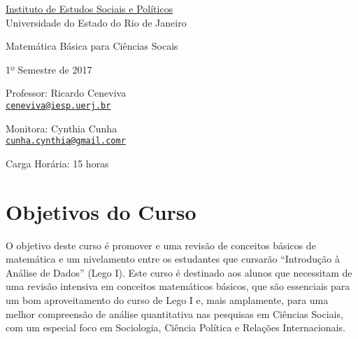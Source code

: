 \documentclass[a4paper, 12pt]{article}
\def\name{Ricardo Ceneviva}
\begin{document}
\pagestyle{plain}



\begin{center}
\begin{bf} 

\href{http://www.iesp.uerj.br/}{Instituto de Estudos Sociais e Políticos} \\

Universidade do Estado do Rio de Janeiro \\


\vspace{0.5cm}

\Large

\Large{Matemática Básica para Ciências Socais}

\vspace{0.5cm}

\normalsize


1º Semestre de 2017 \\
\vspace{0.5cm}


Professor: Ricardo Ceneviva \\
\href{mailto:ceneviva@iesp.uerj.br}{\tt ceneviva@iesp.uerj.br} \\
\vspace{0.25cm}

Monitora: Cynthia Cunha \\
\href{mailto:cunha.cynthia@gmail.com}{\tt cunha.cynthia@gmail.comr} \\
\vspace{0.5cm}

Carga Horária: 15 horas \\
 
\end{bf}
\end{center}


\section*{Objetivos do Curso}

O objetivo deste curso é promover e uma revisão de conceitos básicos de matemática e um nivelamento entre os estudantes que cursarão ``Introdução à Análise de Dados'' (Lego I). Este curso é destinado aos alunos que necessitam de uma revisão intensiva em conceitos matemáticos básicos, que são essenciais para um bom aproveitamento do curso de Lego I e, mais amplamente, para uma melhor compreensão de análise quantitativa nas pesquisas em Ciências Sociais, com um especial foco em Sociologia, Ciência Política e Relações Internacionais.
\end{document}

